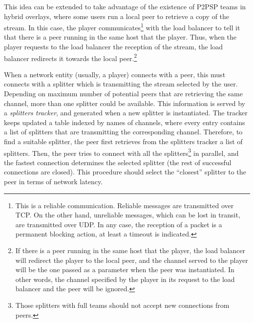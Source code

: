 This idea can be extended to take advantage of the existence of P2PSP
teams in hybrid overlays, where some users run a local peer to
retrieve a copy of the stream. In this case, the player
communicates\footnote{This is a reliable communication. Reliable
  messages are transmitted over TCP. On the other hand, unreliable
  messages, which can be lost in transit, are transmitted over UDP. In
  any case, the reception of a packet is a permanent blocking action,
  at least a timeout is indicated.} with the load balancer to tell it
that there is a peer running in the same host that the player. Thus,
when the player requests to the load balancer the reception of the
stream, the load balancer redirects it towards the local
peer.\footnote{If there is a peer running in the same host that the
  player, the load balancer will redirect the player to the local
  peer, and the channel served to the player will be the one passed as
  a parameter when the peer was instantiated. In other words, the
  channel specified by the player in its request to the load balancer
  and the peer will be ignored.}

When a network entity (usually, a player) connects with a peer, this
must connects with a splitter which is transmitting the stream
selected by the user. Depending on maximum number of potential peers
that are retrieving the same channel, more than one splitter could be
available. This information is served by a \emph{splitters tracker},
and generated when a new splitter is instantiated. The tracker keeps
updated a table indexed by names of channels, where every entry
contains a list of splitters that are transmitting the corresponding
channel. Therefore, to find a suitable splitter, the peer first
retrieves from the splitters tracker a list of splitters. Then, the
peer tries to connect with all the splitters\footnote{Those splitters
  with full teams should not accept new connections from peers.} in
parallel, and the fastest connection determines the selected splitter
(the rest of successful connections are closed). This procedure should
select the ``closest'' splitter to the peer in terms of network
latency.


